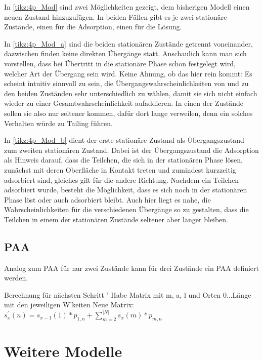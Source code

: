 In \ref{tikz:4p_Mod} sind zwei Möglichkeiten gezeigt, dem bisherigen Modell einen neuen Zustand hinzuzufügen.
In beiden Fällen gibt es je zwei stationäre Zustände, einen für die Adsorption, einen für die Lösung. 

In \ref{tikz:4p_Mod_a} sind die beiden stationären Zustände getrennt voneinander, dazwischen finden keine direkten Übergänge statt. 
Anschaulich kann man sich vorstellen, dass bei Übertritt in die stationäre Phase schon festgelegt wird, welcher Art der Übergang sein wird.
Keine Ahnung, ob das hier rein kommt: Es scheint intuitiv sinnvoll zu sein, die Übergangswahrscheinlichkeiten von und zu den beiden Zuständen sehr unterschiedlich zu wählen, damit sie sich nicht einfach wieder zu einer Gesamtwahrscheinlichkeit aufaddieren. In einen der Zustände sollen sie also nur seltener kommen, dafür dort lange verweilen, denn ein solches Verhalten würde zu Tailing führen.

In \ref{tikz:4p_Mod_b} dient der erste stationäre Zustand als Übergangszustand zum zweiten stationären Zustand. Dabei ist der Übergangszustand die Adsorption als Hinweis darauf, dass die Teilchen, die sich in der stationären Phase lösen, zunächst mit deren Oberfläche in Kontakt treten und zumindest kurzzeitig adsorbiert sind, gleiches gilt für die andere Richtung. Nachdem ein Teilchen adsorbiert wurde, besteht die Möglichkeit, dass es sich noch in der stationären Phase löst oder auch adsorbiert bleibt. Auch hier liegt es nahe, die Wahrscheinlichkeiten für die verschiedenen Übergänge so zu gestalten, dass die Teilchen in einem der stationären Zustände seltener aber länger bleiben.
 


\subsection{PAA}

Analog zum PAA für nur zwei Zustände kann für drei Zustände ein PAA definiert werden. 


Berechnung für nächsten Schritt '
Habe Matrix mit m, a, l und Orten 0...Länge mit den jeweiligen W'keiten
Neue Matrix:
$s^{'}_x(n) = s_{x-1}(1) * p_{1,n} + \sum^{|N|}_{m=2}{s_x(m) * p_{m,n}}$


\section{Weitere Modelle}

